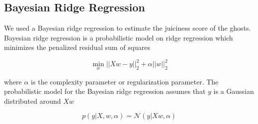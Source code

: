 \documentclass[11pt]{amsart}
\begin{document}

\subsection{Bayesian Ridge Regression}

We used a Bayesian ridge regression to estimate the juiciness score of the ghosts. Bayesian ridge regression is a probabilistic model on ridge regression which minimizes the penalized residual sum of squares

$$ \min_w ||Xw - y||_2^2 + \alpha||w||_2^2 $$

where $\alpha$ is the complexity parameter or regularization parameter. The probabilistic model for the Bayesian ridge regression assumes that $y$ is a Gaussian distributed around $Xw$

$$ p(y | X, w, \alpha) = \mathcal{N}(y  | Xw, \alpha) $$ 
\end{document}
